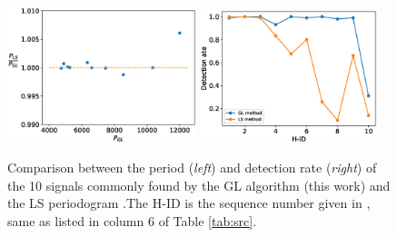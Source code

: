 \documentclass[fleqn,usenatbib]{mnras}
\begin{document}

\begin{figure}
\centering
\includegraphics[width=0.49\textwidth]{./figure/LW/P_comp.eps}
\includegraphics[width=0.46\textwidth]{./figure/sim_LW/Pdet_com.eps}
\caption{Comparison between the period ({\it left}) and detection rate ({\it right}) of the 10 signals commonly found by the GL algorithm (this work) and the LS periodogram \citep{2012ApJ...746..165H}.The H-ID is the sequence number given in \citet{2012ApJ...746..165H}, same as listed in column 6 of Table \ref{tab:src}. 
\label{fig:com}}
\end{figure}
\end{document}
